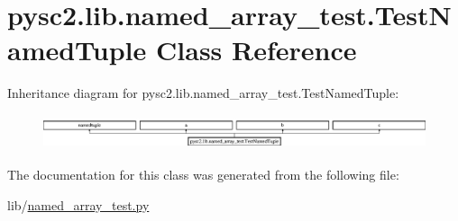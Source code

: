 \hypertarget{classpysc2_1_1lib_1_1named__array__test_1_1_test_named_tuple}{}\section{pysc2.\+lib.\+named\+\_\+array\+\_\+test.\+Test\+Named\+Tuple Class Reference}
\label{classpysc2_1_1lib_1_1named__array__test_1_1_test_named_tuple}
Inheritance diagram for pysc2.\+lib.\+named\+\_\+array\+\_\+test.\+Test\+Named\+Tuple\+:\begin{figure}[H]
\begin{center}
\leavevmode
\includegraphics[height=1.025641cm]{classpysc2_1_1lib_1_1named__array__test_1_1_test_named_tuple}
\end{center}
\end{figure}


The documentation for this class was generated from the following file\+:\begin{DoxyCompactItemize}
\item 
lib/\mbox{\hyperlink{named__array__test_8py}{named\+\_\+array\+\_\+test.\+py}}\end{DoxyCompactItemize}
